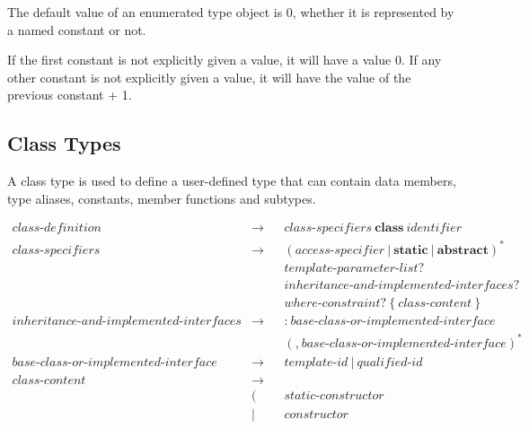 \documentclass[a4paper,oneside,11pt]{article}
\begin{document}
The default value of an enumerated type object is 0, whether it is represented by a named constant or not.

If the first constant is not explicitly given a value, it will have a value 0.
If any other constant is not explicitly given a value, it will have the value of the previous constant + 1.

\subsection{Class Types}\label{sec:classtypes}\label{classdefinition}

A class type is used to define a user-defined type that can contain data members, type aliases, constants, member functions and subtypes.

\begin{align*}
class\textrm{-}definition &\rightarrow & &class\textrm{-}specifiers \> \textbf{class} \> \hyperref[identifier]{identifier}\\
class\textrm{-}specifiers &\rightarrow & &(\hyperref[accessspecifier]{access\textrm{-}specifier} \> | \> \textbf{static} \> | \> \textbf{abstract})^*\\
& & &\hyperref[templateparameterlist]{template\textrm{-}parameter\textrm{-}list}?\\
& & &inheritance\textrm{-}and\textrm{-}implemented\textrm{-}interfaces?\\
& & &\hyperref[whereconstraint]{where\textrm{-}constraint}? \> \texttt{\{} \> class\textrm{-}content \> \texttt{\}}\\
inheritance\textrm{-}and\textrm{-}implemented\textrm{-}interfaces &\rightarrow & &\texttt{:} \>
base\textrm{-}class\textrm{-}or\textrm{-}implemented\textrm{-}interface\\
& & &(\texttt{,} \> base\textrm{-}class\textrm{-}or\textrm{-}implemented\textrm{-}interface)^*\\
base\textrm{-}class\textrm{-}or\textrm{-}implemented\textrm{-}interface &\rightarrow & &\hyperref[templateid]{template\textrm{-}id} \> |
\> \hyperref[qualifiedid]{qualified\textrm{-}id}\\
class\textrm{-}content &\rightarrow\\
&( & &\hyperref[staticconstructor]{static\textrm{-}constructor}\\
&| & &\hyperref[constructor]{constructor}\\

\end{align*}
\end{document}
